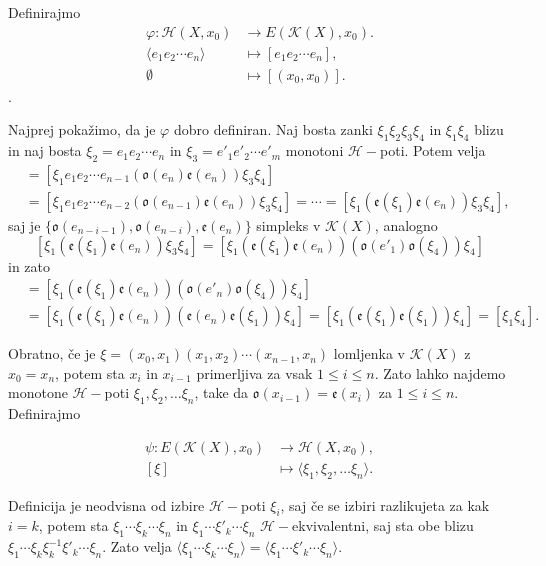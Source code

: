 \documentclass[mat1]{fmfdelo}
\DeclareRobustCommand{\h}{
    \mathcal{H}}
\begin{document}
\begin{dokaz}
    Definirajmo 
    \begin{align*}
\varphi\colon \mathscr{H}(X,x_0)&\rightarrow E(\mathcal{K}(X),x_0).\\
\langle e_1e_2 \cdots e_n\rangle&\mapsto [e_1e_2 \cdots e_n],\\
\emptyset &\mapsto [(x_0,x_0)].
    \end{align*}.

    Najprej pokažimo, da je $\varphi$ dobro definiran.
    Naj bosta zanki $\xi_1 \xi_2 \xi_3 \xi_4$ in $\xi_1 \xi_4 $ blizu in naj bosta $\xi_2 = e_1e_2 \cdots e_n$ in $\xi_3 = e'_1e'_2 \cdots e'_m$ monotoni $\h-$poti. Potem velja 
\begin{align*}
    [\xi_1 \xi_2 \xi_3 \xi_4]&=[\xi_1 e_1e_2 \cdots e_{n-1}(\mathfrak{o}(e_n)\mathfrak{e}(e_n)) \xi_3 \xi_4]\\
    &=[\xi_1 e_1e_2 \cdots e_{n-2}(\mathfrak{o}(e_{n-1})\mathfrak{e}(e_n)) \xi_3 \xi_4]=\cdots=[\xi_1(\mathfrak{e}(\xi_1)\mathfrak{e}(e_n)) \xi_3 \xi_4],
\end{align*}
saj je $\{\mathfrak{o}(e_{n-i-1}),\mathfrak{o}(e_{n-i}),\mathfrak{e}(e_{n})\}$ simpleks v $\mathcal{K}(X)$, analogno 
$$
[\xi_1(\mathfrak{e}(\xi_1)\mathfrak{e}(e_n)) \xi_3 \xi_4]=[\xi_1(\mathfrak{e}(\xi_1)\mathfrak{e}(e_n))( \mathfrak{o}(e'_1)\mathfrak{o}(\xi_4)) \xi_4]
$$
in zato 
\begin{align*}
    [\xi_1 \xi_2 \xi_3 \xi_4]&=[\xi_1(\mathfrak{e}(\xi_1)\mathfrak{e}(e_n)) (\mathfrak{o}(e'_n)\mathfrak{o}(\xi_4)) \xi_4]\\
    &=[\xi_1(\mathfrak{e}(\xi_1)\mathfrak{e}(e_n)) (\mathfrak{e}(e_n)\mathfrak{e}(\xi_1)) \xi_4]=[\xi_1(\mathfrak{e}(\xi_1) \mathfrak{e}(\xi_1)) \xi_4]=[\xi_1 \xi_4].
\end{align*}


Obratno, če je $\xi =(x_0,x_1)(x_1,x_2) \cdots (x_{n-1},x_n)$ lomljenka v $\mathcal{K}(X)$ z $x_0=x_n$, potem sta $x_i$ in $x_{i-1}$ primerljiva za vsak $1\leq i \leq n$. Zato lahko najdemo monotone $\h-$poti $\xi_1, \xi_2, \ldots  \xi_n$, take da $\mathfrak{o}(x_{i-1})=\mathfrak{e}(x_i)$ za $1\leq i \leq n$. Definirajmo

\begin{align*}
    \psi\colon  E(\mathcal{K}(X),x_0)&\rightarrow \mathscr{H}(X,x_0),\\
    [\xi]&\mapsto \langle\xi_1, \xi_2, \ldots  \xi_n\rangle.
\end{align*}

Definicija je neodvisna od izbire $\h-$poti $\xi_i$, saj če se izbiri razlikujeta za kak $i=k$, potem sta $\xi_1 \cdots \xi_k \cdots \xi_n$ in $\xi_1 \cdots \xi'_k \cdots \xi_n$ $\h-$ekvivalentni, saj sta obe blizu $\xi_1 \cdots \xi_k\xi_k^{-1}\xi'_k \cdots \xi_n$. Zato velja $\langle \xi_1 \cdots \xi_k \cdots \xi_n \rangle = \langle \xi_1 \cdots \xi'_k \cdots \xi_n \rangle$.


\end{dokaz}
\end{document}
